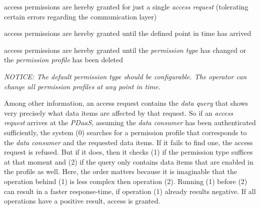\documentclass[12pt,english,a4paper,titlepage,cleardoublepage=empty,dottedtoc]{report}
\providecommand{\tightlist}{%
  \setlength{\itemsep}{0pt}\setlength{\parskip}{0pt}}
\begin{document}
\begin{description}
\tightlist
\item[\emph{one-time-only}]
access permissions are hereby granted for just a single \emph{access
request} (tolerating certain errors regarding the communication layer)
\item[\emph{expires-on-date}]
access permissions are hereby granted until the defined point in time
has arrived
\item[\emph{until-further-notice}]
access permissions are hereby granted until the \emph{permission type}
has changed or the \emph{permission profile} has been deleted
\end{description}

\emph{NOTICE: The default permission type should be configurable. The
operator can change all permission profiles at any point in time.}

Among other information, an access request contains the \emph{data
query} that shows very precisely what data items are affected by that
request. So if an \emph{access request} arrives at the \emph{PDaaS},
assuming the \emph{data consumer} has been authenticated sufficiently,
the system (0) searches for a permission profile that corresponds to the
\emph{data consumer} and the requested data items. If it fails to find
one, the access request is refused. But if it does, then it checks (1)
if the permission type suffices at that moment and (2) if the query only
contains data items that are enabled in the profile as well. Here, the
order matters because it is imaginable that the operation behind (1) is
less complex then operation (2). Running (1) before (2) can result in a
faster response-time, if operation (1) already results negative. If all
operations have a positive result, access is granted.
\end{document}
